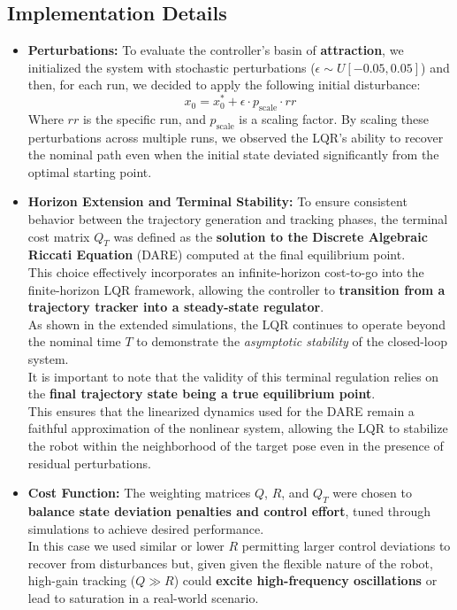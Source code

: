 \subsection{Implementation Details}
\begin{itemize}
\item \textbf{Perturbations:} To evaluate the controller's basin of \textbf{attraction}, we initialized the system with stochastic perturbations ($\epsilon \sim U[-0.05, 0.05]$) and then, for each run, we decided to apply the following initial disturbance: 
\begin{equation}
    x_0 = x^*_0 + \epsilon \cdot p_\text{scale} \cdot rr 
\end{equation}
Where $rr$ is the specific run, and $p_\text{scale}$ is a scaling factor. By scaling these perturbations across multiple runs, we observed the LQR's ability to recover the nominal path even when the initial state deviated significantly from the optimal starting point.
\item \textbf{Horizon Extension and Terminal Stability:} 
To ensure consistent behavior between the trajectory generation and tracking phases, the terminal cost matrix $Q_T$ was defined as the \textbf{solution to the Discrete Algebraic Riccati Equation} (DARE) computed at the final equilibrium point. \\
This choice effectively incorporates an infinite-horizon cost-to-go into the finite-horizon LQR framework, allowing the controller to \textbf{transition from a trajectory tracker into a steady-state regulator}. \\
As shown in the extended simulations, the LQR continues to operate beyond the nominal time $T$ to demonstrate the \textit{asymptotic stability} of the closed-loop system. \\
It is important to note that the validity of this terminal regulation relies on the \textbf{final trajectory state being a true equilibrium point}. \\
This ensures that the linearized dynamics used for the DARE remain a faithful approximation of the nonlinear system, allowing the LQR to stabilize the robot within the neighborhood of the target pose even in the presence of residual perturbations.
\item \textbf{Cost Function:} The weighting matrices $Q$, $R$, and $Q_T$ were chosen to \textbf{balance state deviation penalties and control effort}, tuned through simulations to achieve desired performance.\\
In this case we used similar or lower $R$ permitting larger control deviations to recover from disturbances but, given 
given the flexible nature of the robot, high-gain tracking ($Q \gg R$) could \textbf{excite high-frequency oscillations} or lead to saturation in a real-world scenario.
\end{itemize}

